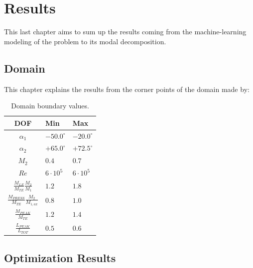 \chapter{Results}
\label{chapter:results}

This last chapter aims to sum up the results coming from the machine-learning modeling of the problem to its modal decomposition.

\section{Domain}

This chapter explains the results from the corner points of the domain made by:

\begin{table}[!h]
\caption{Domain boundary values.}
\label{tab:value}
\begin{center}
    \begin{tabular}{||c l l||} 
        \hline
        \rule{0pt}{10pt} DOF & Min & Max \\ [0.5ex] 
        \hline\hline
        \rule{0pt}{10pt} $\alpha_1$ & $-50.0^{\circ}$ & $-20.0^{\circ}$  \\ 
        \hline
        \rule{0pt}{10pt} $\alpha_2$ & $+65.0^{\circ}$ & $+72.5^{\circ}$ \\
        \hline
        \rule{0pt}{10pt} $M_2$ & $0.4$ & $0.7$ \\
        \hline 
        \rule{0pt}{10pt} $Re$ & $6 \cdot 10^5$ & $6 \cdot 10^5$ \\
        \hline 
        \rule{0pt}{13pt} $\frac{M_{LE}}{M_{TE}}\frac{M_2}{M_1}$ & $1.2$ & $1.8$ \\[4pt]
        \hline 
        \rule{0pt}{13pt} $\frac{M_{PRESS}}{M_{TE}}\frac{M_2}{M_{1, ax}}$ & $0.8$ & $1.0$ \\[4pt] 
        \hline 
        \rule{0pt}{13pt} $\frac{M_{PEAK}}{M_{TE}}$ & $1.2$ & $1.4$ \\[4pt]
        \hline 
        \rule{0pt}{13pt} $\frac{L_{PEAK}}{L_{TOT}}$ & $0.5$ & $0.6$ \\ [4pt] 
        \hline
    \end{tabular}
\end{center}
\end{table}

\section{Optimization Results}

